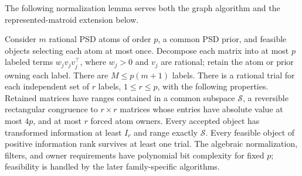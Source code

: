 The following normalization lemma serves both the graph algorithm and the
represented-matroid extension below.
\begin{lemma}
\label{lem:spectral-normalization}
Consider $m$ rational PSD atoms of order $p$, a common PSD prior, and feasible
objects selecting each atom at most once. Decompose each matrix into at most
$p$ labeled terms $w_jv_jv_j^\top$, where $w_j>0$ and $v_j$ are rational;
retain the atom or prior owning each label. There are $M\le p(m+1)$ labels.
There is a rational trial for each independent set of $r$ labels,
$1\le r\le p$, with the following properties. Retained matrices have ranges contained in a
common subspace $\mathcal S$, a reversible rectangular congruence to
$r\times r$ matrices whose entries have absolute value at most $4p$, and
at most $r$ forced atom owners. Every accepted object has transformed
information at least $I_r$ and range exactly $\mathcal S$. Every feasible
object of positive information rank survives at least one trial.
The algebraic normalization, filters, and owner requirements have polynomial
bit complexity for fixed $p$; feasibility is handled by the later
family-specific algorithms.
\end{lemma}
